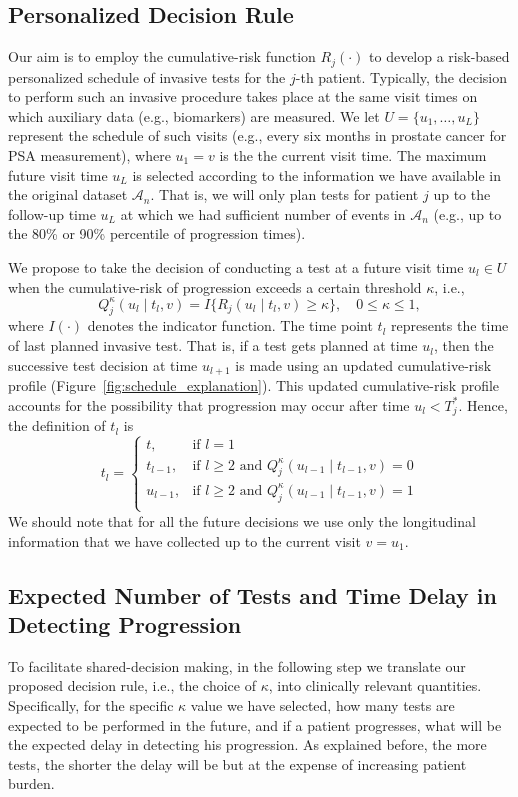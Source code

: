 \subsection{Personalized Decision Rule} \label{subsec:pers_schedule}
Our aim is to employ the cumulative-risk function $R_j(\cdot)$ to develop a risk-based personalized schedule of invasive tests for the $j$-th patient. Typically, the decision to perform such an invasive procedure takes place at the same visit times on which auxiliary data (e.g., biomarkers) are measured. We let $U = \{u_1, \ldots, u_L\}$ represent the schedule of such visits (e.g., every six months in prostate cancer for PSA measurement), where $u_1 = v$ is the the current visit time. The maximum future visit time $u_L$ is selected according to the information we have available in the original dataset $\mathcal A_n$. That is, we will only plan tests for patient $j$ up to the follow-up time $u_L$ at which we had sufficient number of events in $\mathcal A_n$ (e.g., up to the 80\% or 90\% percentile of progression times). 

We propose to take the decision of conducting a test at a future visit time $u_l \in U$ when the cumulative-risk of progression exceeds a certain threshold $\kappa$, i.e.,
\[
Q_j^\kappa (u_l \mid t_l, v) = I \big \{ R_j(u_l \mid t_l, v) \geq \kappa \big\}, \quad 0 \leq \kappa \leq 1,
\]
where $I(\cdot)$ denotes the indicator function. The time point $t_l$ represents the time of last planned invasive test. That is, if a test gets planned at time $u_l$, then the successive test decision at time $u_{l+1}$ is made using an updated cumulative-risk profile (Figure~\ref{fig:schedule_explanation}). This updated cumulative-risk profile accounts for the possibility that progression may occur after time $u_l < T^*_j$. Hence, the definition of $t_l$ is
\[
t_l = \left \{ 
\begin{array}{ll}
t, & \mbox{if } l = 1\\
t_{l-1}, & \mbox{if } l \geq 2 \mbox{ and } Q_j^\kappa (u_{l-1} \mid t_{l-1}, v) = 0\\
u_{l-1}, & \mbox{if } l \geq 2 \mbox{ and } Q_j^\kappa (u_{l-1} \mid t_{l-1}, v) = 1\\
\end{array}
\right.
\]
We should note that for all the future decisions we use only the longitudinal information that we have collected up to the current visit $v = u_1$.

\subsection{Expected Number of Tests and Time Delay in Detecting Progression}
\label{subsec:exp_delay_estimation}
To facilitate shared-decision making, in the following step we translate our proposed decision rule, i.e., the choice of $\kappa$, into clinically relevant quantities. Specifically, for the specific $\kappa$ value we have selected, how many tests are expected to be performed in the future, and if a patient progresses, what will be the expected delay in detecting his progression. As explained before, the more tests, the shorter the delay will be but at the expense of increasing patient burden.

